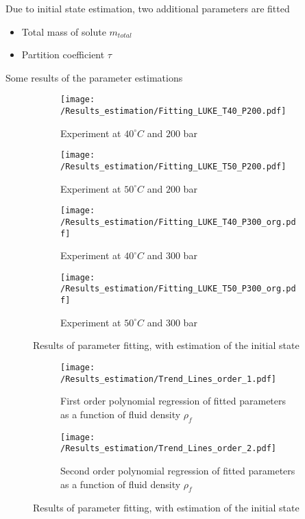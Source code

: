 \documentclass[../Article_Model_Parameters.tex]{subfiles}
\begin{document}
    Due to initial state estimation, two additional parameters are fitted

    \begin{itemize}
        \item Total mass of solute $m_{total}$
        \item Partition coefficient $\tau$
    \end{itemize}
	
	Some results of the parameter estimations

	\begin{figure*}
		\centering
		\begin{subfigure}[b]{0.7\textwidth}
			\centering
			\texttt{[image: /Results\_estimation/Fitting\_LUKE\_T40\_P200.pdf]}
			\caption{Experiment at $40^\circ C$ and $200$ bar}
		\end{subfigure}
		\hfill
		\begin{subfigure}[b]{0.7\textwidth}
			\centering
			\texttt{[image: /Results\_estimation/Fitting\_LUKE\_T50\_P200.pdf]}
			\caption{Experiment at $50^\circ C$ and $200$ bar}
		\end{subfigure}
		\hfill
		\begin{subfigure}[b]{0.7\textwidth}
			\centering
			\texttt{[image: /Results\_estimation/Fitting\_LUKE\_T40\_P300\_org.pdf]}
			\caption{Experiment at $40^\circ C$ and $300$ bar}
		\end{subfigure}
		\hfill
		\begin{subfigure}[b]{0.7\textwidth}
			\centering
			\texttt{[image: /Results\_estimation/Fitting\_LUKE\_T50\_P300\_org.pdf]}
			\caption{Experiment at $50^\circ C$ and $300$ bar}
		\end{subfigure}
		\caption{Results of parameter fitting, with estimation of the initial state}
	\end{figure*}

	\begin{figure*}
	\centering
	\begin{subfigure}[b]{0.85\textwidth}
		\centering
		\texttt{[image: /Results\_estimation/Trend\_Lines\_order\_1.pdf]}
		\caption{First order polynomial regression of fitted parameters as a function of fluid density $\rho_f$}
	\end{subfigure}
	\hfill
	\begin{subfigure}[b]{0.85\textwidth}
		\centering
		\texttt{[image: /Results\_estimation/Trend\_Lines\_order\_2.pdf]}
		\caption{Second order polynomial regression of fitted parameters as a function of fluid density $\rho_f$}
	\end{subfigure}
	\caption{Results of parameter fitting, with estimation of the initial state}
\end{figure*}
		
	
\end{document}
